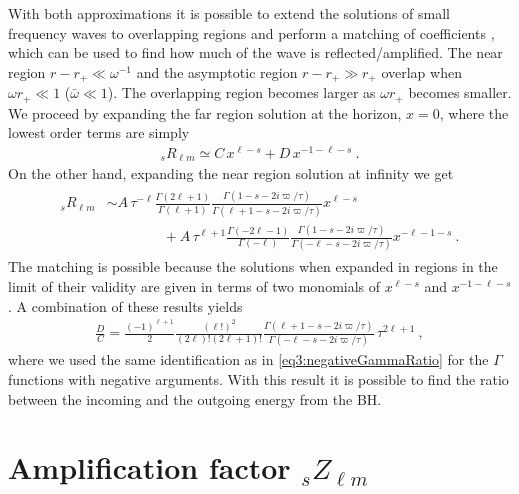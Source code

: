 With both approximations it is possible to extend the solutions of small frequency waves to overlapping regions and perform a matching of coefficients \cite{Starobinsky1973a, Starobinsky1973b}, which can be used to find how much of the wave is reflected/amplified.
The near region $r-r_{+}\ll \omega^{-1}$ and the asymptotic region $r-r_{+}\gg r_{+}$ overlap when $\omega r_{+} \ll 1$ ($\bar{\omega}\ll 1$). The overlapping region becomes larger as $\omega r_{+}$ becomes smaller.
We proceed by expanding the far region solution  at the horizon, $x=0$, where the lowest order terms are simply
\begin{align}
    {}_{s}R_{\ell m} \simeq C \, x^{\ell-s} + D \, x^{-1-\ell-s} ~.
\end{align}
On the other hand, expanding the near region solution  at infinity we get
\begin{align}
    \begin{split}
        {}_{s}R_{\ell m} &\sim A \, \tau^{-\ell} \frac{ \Gamma(2\ell+1)}{\Gamma(\ell+1)} \frac{\Gamma(1-s - 2 i \varpi/\tau)}{\Gamma(\ell+1 - s - 2 i \varpi/\tau)} x^{\ell-s} \\
        &\qquad\qquad + A \, \tau^{\ell+1} \frac{\Gamma(-2\ell-1)}{\Gamma(-\ell)} \frac{\Gamma(1 - s - 2 i \varpi/\tau)}{ \Gamma(-\ell - s - 2 i \varpi/\tau)} x^{-\ell-1-s} ~.
    \end{split}
\end{align}
The matching is possible because the solutions when expanded in regions in the limit of their validity are given in terms of two monomials of $x^{\ell-s}$ and $x^{-1-\ell-s}$.
A combination of these results yields
\begin{align}
    \frac{D}{C} = \frac{(-1)^{\ell+1}}{2} \frac{(\ell !)^2}{(2\ell)! (2\ell+1)!} \frac{\Gamma(\ell+1 - s - 2 i \varpi/\tau)}{\Gamma(-\ell - s - 2 i \varpi/\tau)} \, \tau^{2\ell+1} ~,
\end{align}
where we used the same identification as in \eqref{eq3:negativeGammaRatio} for the $\Gamma$ functions with negative arguments.
With this result it is possible to find the ratio between the incoming and the outgoing energy from the BH.


\section{Amplification factor ${}_{s}Z_{\ell m}$}

